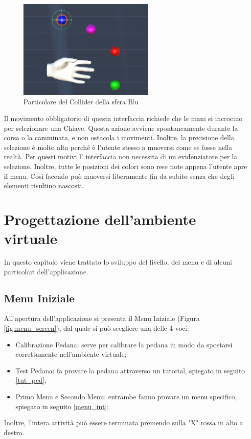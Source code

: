 \documentclass[target=bach,aauheader=]{thud}
\begin{document}
\begin{figure}[h]
    \centering
    \includegraphics[width=0.60\textwidth]{coll}
    \caption{Particolare del Collider della sfera Blu}
    \label{fig:coll}
\end{figure}

\newpage 
Il movimento obbligatorio di questa interfaccia richiede che le mani si incrocino per selezionare una Chiave.
Questa azione avviene spontaneamente durante la corsa o la camminata, e non ostacola i movimenti.
Inoltre, la precisione della selezione è molto alta perché è l'utente stesso a muoversi come se fosse nella realtà.
Per questi motivi l' interfaccia non necessita di un evidenziatore per la selezione.
Inoltre, tutte le posizioni dei colori sono rese note appena l'utente apre il menu.
Così facendo può muoversi liberamente fin da subito senza che degli elementi risultino nascosti. 

\chapter{Progettazione dell'ambiente virtuale} %

In questo capitolo viene trattato lo sviluppo del livello, dei menu e di alcuni particolari dell'applicazione.

\section{Menu Iniziale}
\label{menu_init}
All'apertura dell'applicazione si presenta il Menu Iniziale (Figura \ref{fig:menu_screen}), dal quale si può scegliere una delle 4 voci:
\begin{itemize}
    \item Calibrazione Pedana: serve per calibrare la pedana in modo da spostarsi correttamente nell'ambiente virtuale;
    \item Test Pedana: fa provare la pedana attraverso un tutorial, spiegato in seguito \ref{tut_ped};
    \item Primo Menu e Secondo Menu: entrambe fanno provare un menu specifico, spiegato in seguito \ref{menu_int};
\end{itemize} 
Inoltre, l'intera attività può essere terminata premendo sulla "X" rossa in alto a destra.
\end{document}
